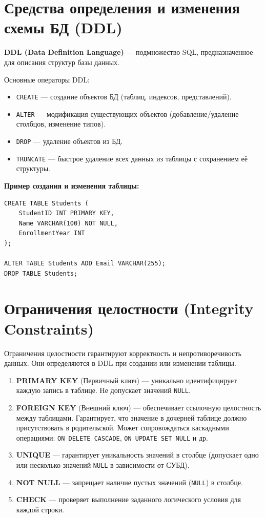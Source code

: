 \documentclass[12pt,a4paper]{article}
\begin{document}
\section{Средства определения и изменения схемы БД (DDL)}
\textbf{DDL (Data Definition Language)} --- подмножество SQL, предназначенное для описания структур базы данных.

Основные операторы DDL:
\begin{itemize}
    \item \texttt{CREATE} --- создание объектов БД (таблиц, индексов, представлений).
    \item \texttt{ALTER} --- модификация существующих объектов (добавление/удаление столбцов, изменение типов).
    \item \texttt{DROP} --- удаление объектов из БД.
    \item \texttt{TRUNCATE} --- быстрое удаление всех данных из таблицы с сохранением её структуры.
\end{itemize}

\textbf{Пример создания и изменения таблицы:}
\begin{lstlisting}
CREATE TABLE Students (
    StudentID INT PRIMARY KEY,
    Name VARCHAR(100) NOT NULL,
    EnrollmentYear INT
);

ALTER TABLE Students ADD Email VARCHAR(255);
DROP TABLE Students;
\end{lstlisting}

\section{Ограничения целостности (Integrity Constraints)}
Ограничения целостности гарантируют корректность и непротиворечивость данных. Они определяются в DDL при создании или изменении таблицы.

\begin{enumerate}
    \item \textbf{PRIMARY KEY} (Первичный ключ) --- уникально идентифицирует каждую запись в таблице. Не допускает значений \texttt{NULL}.
    \item \textbf{FOREIGN KEY} (Внешний ключ) --- обеспечивает ссылочную целостность между таблицами. Гарантирует, что значение в дочерней таблице должно присутствовать в родительской. Может сопровождаться каскадными операциями: \texttt{ON DELETE CASCADE}, \texttt{ON UPDATE SET NULL} и др.
    \item \textbf{UNIQUE} --- гарантирует уникальность значений в столбце (допускает одно или несколько значений \texttt{NULL} в зависимости от СУБД).
    \item \textbf{NOT NULL} --- запрещает наличие пустых значений (\texttt{NULL}) в столбце.
    \item \textbf{CHECK} --- проверяет выполнение заданного логического условия для каждой строки.
\end{enumerate}
\end{document}
